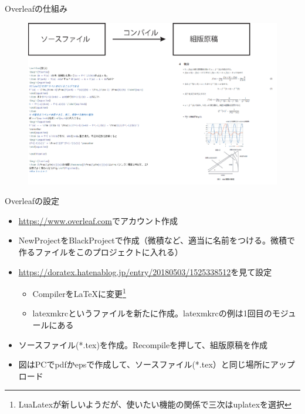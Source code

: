 \begin{slide}{Overleafの仕組み}
 \begin{figure}[htbp]
 \begin{center} 
  \includegraphics[width=120mm]{calculus1/latex.eps}
 \end{center}
\end{figure}
\end{slide}
\begin{slide}{Overleafの設定}
\begin{itemize}
\item \url{https://www.overleaf.com}でアカウント作成
\item NewProjectをBlackProjectで作成（微積など、適当に名前をつける。微積で作るファイルをこのプロジェクトに入れる）
\item \url{https://doratex.hatenablog.jp/entry/20180503/1525338512}を見て設定
\begin{itemize}
\item CompilerをLaTeXに変更\footnote{LuaLatexが新しいようだが、使いたい機能の関係で三次はuplatexを選択}
\item latexmkrcというファイルを新たに作成。latexmkrcの例は1回目のモジュールにある
\end{itemize}
\item ソースファイル(*.tex)を作成。Recompileを押して、組版原稿を作成
\item 図はPCでpdfかepsで作成して、ソースファイル(*.tex）と同じ場所にアップロード
\end{itemize}
\end{slide}